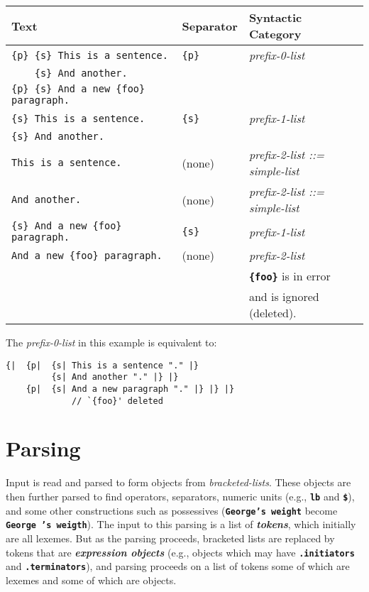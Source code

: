 \documentclass[12pt]{article}
\newcommand{\TT}[1]{{\tt \bfseries #1}}
\newcommand{\skey}[2]{{\bf \em #1#2}\index{#1}}
\newenvironment{indpar}[1][0.3in]%
	{\begin{list}{}%
		     {\setlength{\itemsep}{0in}%
		      \setlength{\topsep}{0in}%
		      \setlength{\parsep}{1ex}%
		      \setlength{\labelwidth}{#1}%
		      \setlength{\leftmargin}{#1}%
		      \addtolength{\leftmargin}{\labelsep}}%
	 \item}%
	{\end{list}}
\begin{document}
\begin{tabular}{lll}
Text	& Separator &  Syntactic Category
\\\hline
\tt \{p\} \{s\} This is a sentence.	& \tt \{p\} & \em prefix-0-list \\
\tt ~~~ \{s\} And another. \\
\tt \{p\} \{s\} And a new \{foo\} paragraph.
\\\hline
\tt \{s\} This is a sentence.	& \tt \{s\} & \em prefix-1-list \\
\tt \{s\} And another.
\\\hline
\tt This is a sentence.	& (none) & \em prefix-2-list  \rm ::= \em simple-list
\\\hline
\tt And another. & (none) & \em prefix-2-list \rm ::= \em simple-list
\\\hline
\tt \{s\} And a new \{foo\} paragraph. & \tt \{s\} & \em prefix-1-list
\\\hline
\tt And a new \{foo\} paragraph. & (none) & \em prefix-2-list \\
			       &        & \TT{\{foo\}} is in error \\
			       &        & and is ignored (deleted).
\end{tabular}

The {\em prefix-0-list} in this example is equivalent to:
\begin{indpar}\begin{verbatim}
{|  {p|  {s| This is a sentence "." |}
         {s| And another "." |} |}
    {p|  {s| And a new paragraph "." |} |} |}
             // `{foo}' deleted
\end{verbatim}\end{indpar}

\section{Parsing}
\label{PARSING}

Input is read and parsed to form objects from {\em bracketed-lists}.
These objects are then further parsed to find operators, separators,
numeric units (e.g., \TT{lb} and \TT{\$}), and some other constructions
such as possessives (\TT{George's weight} become \TT{George 's weigth}).
The input to this parsing is a list of \skey{token}s, which initially are
all lexemes.  But as the parsing proceeds, bracketed lists are replaced
by tokens that are \skey{expression object}s (e.g., objects which may have
\TT{.initiators} and \TT{.terminators}), and parsing proceeds on 
a list of tokens some of which are lexemes and some of which are objects.
\end{document}
